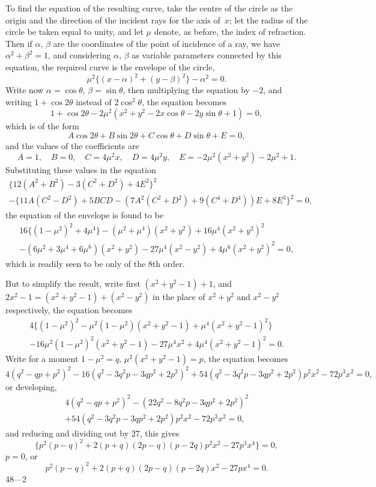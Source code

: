 \documentclass[11pt,a4paper]{book}
\begin{document}
\begin{center}
To find the equation of the resulting curve, take the centre
of the circle as the origin and the direction of the incident
rays for the axis of~$x$; let the radius of the circle be taken
equal to unity, and let $\mu$ denote, as before, the index of refraction.
Then if $\alpha$, $\beta$ are the coordinates of the point of incidence
of a ray, we have $\alpha^{2} + \beta^{2} = 1$, and considering $\alpha$,
$\beta$ as variable parameters connected by this equation, the
required curve is the envelope of the circle,
\[
\mu^{2} \{ (x - \alpha)^{2} + (y - \beta)^{2} \} - \alpha^{2} = 0.
\]
Write now $\alpha = \cos\theta$, $\beta = \sin\theta$, then multiplying the
equation by $-2$, and writing $1 + \cos 2\theta$ instead of $2\cos^{2}\theta$,
the equation becomes
\[
1 + \cos 2\theta - 2\mu^{2}(x^{2} + y^{2} - 2x\cos\theta - 2y\sin\theta + 1) = 0,
\]
which is of the form
\[
A\cos 2\theta + B\sin 2\theta + C\cos\theta + D\sin\theta + E = 0,
\]
and the values of the coefficients are
\[
A = 1, \quad B = 0, \quad C = 4\mu^{2}x, \quad D = 4\mu^{2}y, \quad
E = -2\mu^{2}(x^{2} + y^{2}) - 2\mu^{2} + 1.
\]
Substituting these values in the equation
\begin{multline*}
\{ 12(A^{2} + B^{2}) - 3(C^{2} + D^{2}) + 4E^{2} \}^{2} \\
- \{ 11A(C^{2} - D^{2}) + 5BCD - (7A^{2}(C^{2} + D^{2}) + 9(C^{4} + D^{4}))E + 8E^{3} \}^{2}
= 0,
\end{multline*}
the equation of the envelope is found to be
\begin{multline*}
16\{ (1 - \mu^{2})^{2} + 4\mu^{4} \} - (\mu^{2} + \mu^{4})(x^{2} + y^{2})
+ 16\mu^{4}(x^{2} + y^{2})^{2} \\
- (6\mu^{2} + 3\mu^{4} + 6\mu^{6})(x^{2} + y^{2}) - 27\mu^{4}(x^{2} - y^{2})
+ 4\mu^{6}(x^{2} + y^{2})^{2} = 0,
\end{multline*}
which is readily seen to be only of the 8th order.

But to simplify the result, write first
$(x^{2} + y^{2} - 1) + 1$, and $2x^{2} - 1 = (x^{2} + y^{2} - 1) + (x^{2} - y^{2})$
in the place of $x^{2} + y^{2}$ and $x^{2} - y^{2}$ respectively,
the equation becomes
\begin{multline*}
4\{ (1 - \mu^{2})^{2} - \mu^{2}(1 - \mu^{2})(x^{2} + y^{2} - 1)
+ \mu^{4}(x^{2} + y^{2} - 1)^{2} \} \\
- 16\mu^{2}(1 - \mu^{2})^{2}(x^{2} + y^{2} - 1) - 27\mu^{4}x^{2}
+ 4\mu^{4}(x^{2} + y^{2} - 1)^{2} = 0.
\end{multline*}
Write for a moment $1 - \mu^{2} = q$,
$\mu^{2}(x^{2} + y^{2} - 1) = p$, the equation becomes
\[
4(q^{2} - qp + p^{2})^{2} - 16(q^{2} - 3q^{2}p - 3qp^{2} + 2p^{2})^{2}
+ 54(q^{2} - 3q^{2}p - 3qp^{2} + 2p^{2})p^{2}x^{2} - 72p^{3}x^{2} = 0,
\]
or developing,
\begin{multline*}
4(q^{2} - qp + p^{2})^{2} - (22q^{2} - 8q^{2}p - 3qp^{2} + 2p^{2})^{2} \\
+ 54(q^{2} - 3q^{2}p - 3qp^{2} + 2p^{2})p^{2}x^{2} - 72p^{3}x^{2} = 0,
\end{multline*}
and reducing and dividing out by $27$, this gives
\[
\{ p^{2}(p - q)^{2} + 2(p + q)(2p - q)(p - 2q)p^{2}x^{2} - 27p^{3}x^{4} \} = 0,
\]
\ie{} $p = 0$, or
\[
p^{2}(p - q)^{2} + 2(p + q)(2p - q)(p - 2q)x^{2} - 27px^{4} = 0.
\]
48---2


\end{center}
\end{document}
